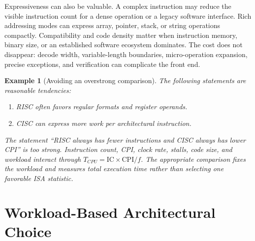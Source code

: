 \documentclass[11pt]{article}
\newtheorem{example}{Example}[section]
\begin{document}
Expressiveness can also be valuable. A complex instruction may reduce the
visible instruction count for a dense operation or a legacy software
interface. Rich addressing modes can express array, pointer, stack, or string
operations compactly. Compatibility and code density matter when instruction
memory, binary size, or an established software ecosystem dominates. The cost
does not disappear: decode width, variable-length boundaries, micro-operation
expansion, precise exceptions, and verification can complicate the front end.

\begin{example}[Avoiding an overstrong comparison]
The following statements are reasonable tendencies:
\begin{enumerate}
  \item RISC often favors regular formats and register operands.
  \item CISC can express more work per architectural instruction.
\end{enumerate}
The statement ``RISC always has fewer instructions and CISC always has lower
CPI'' is too strong. Instruction count, CPI, clock rate, stalls, code size,
and workload interact through $T_{CPU}=\mathrm{IC}\times\mathrm{CPI}/f$.
The appropriate comparison fixes the workload and measures total execution
time rather than selecting one favorable ISA statistic.
\end{example}

\section{Workload-Based Architectural Choice}
\label{sec:workload}
\end{document}
